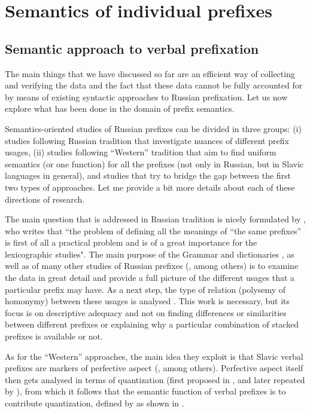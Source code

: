 \chapter{Semantics of individual prefixes} %
\label{Chapter5}
\section{Semantic approach to verbal prefixation}
The main things that we have discussed so far are an efficient way of collecting and verifying the data and the fact that these data cannot be fully accounted for by means of existing syntactic approaches to Russian prefixation. Let us now explore what has been done in the domain of prefix semantics.

Semantics-oriented studies of Russian prefixes can be divided in three groups: (i) studies following Russian tradition that investigate nuances of different prefix usages, (ii) studies following ``Western'' tradition that aim to find uniform semantics (or one function) for all the prefixes (not only in Russian, but in Slavic languages in general), and studies that try to bridge the gap between the first two types of approaches. Let me provide a bit more details about each of these directions of research.

The main question that is addressed in Russian tradition is nicely formulated by \citet[18]{Boguslawski:63}, who writes that ``the problem of defining all the meanings of ``the same prefixes'' is first of all a practical problem and is of a great importance for the lexicographic studies". The main purpose of the Grammar \citep{Grammar:52, Shvedova:82} and dictionaries \citep{Dict:50, Dict:57}, as well as of many other studies of Russian prefixes (\citealt{Avilova:64, Golovin:59, Lopatin:97, Tixonov:98}, among others) is to examine the data in great detail and provide a full picture of the different usages that a particular prefix may have. As a next step, the type of relation (polysemy of homonymy) between these usages is analysed \citep{Krongauz:97, Plungyan:01}. This work is necessary, but its focus is on descriptive adequacy and not on finding differences or similarities between different prefixes or explaining why a particular combination of stacked prefixes is available or not.

As for the ``Western'' approaches, the main idea they exploit is that Slavic verbal prefixes are markers of perfective aspect (\citealt[see, e.g.,][]{Binnick:91, Krifka:92, Zucchi:99}, among others). Perfective aspect itself then gets analysed in terms of quantization (first proposed in \citealt{Krifka:86, Krifka:92}, and later repeated by \citealt{Pinon:95}), from which it follows that the semantic function of verbal prefixes is to contribute quantization, defined by \citet{Krifka:86} as shown in . 

